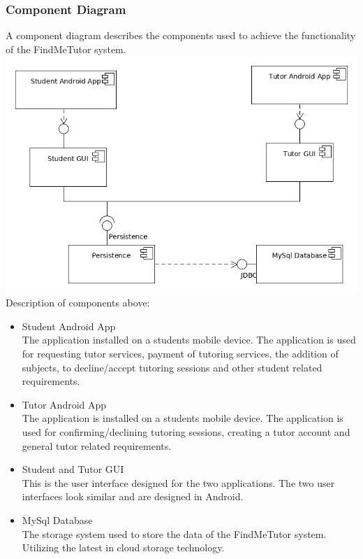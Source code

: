 \documentclass[12pt]{article}
\begin{document}
\subsubsection{Component Diagram}
A component diagram describes the components used to achieve the functionality of the FindMeTutor system.\\
\includegraphics[width=140mm]{./component_diagram/component_diagram.png}\\
Description of components above:
\begin{itemize}
\item Student Android App\\
The application installed on a students mobile device. The application is used for requesting tutor services, payment of tutoring services, the addition of subjects, to decline/accept tutoring sessions and other student related requirements.
\item Tutor Android App\\
The application is installed on a students mobile device. The application is used for confirming/declining tutoring sessions, creating a tutor account and general tutor related requirements.
\item Student and Tutor GUI\\
This is the user interface designed for the two applications. The two user interfaces look similar and are designed in Android.
\item MySql Database\\
The storage system used to store the data of the FindMeTutor system. Utilizing the latest in cloud storage technology.
\end{itemize}

\newpage
\end{document}
